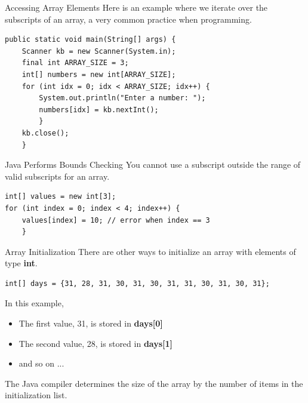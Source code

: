 \documentclass[11pt]{beamer}
\begin{document}
\begin{frame}[fragile]{Accessing Array Elements}
Here is an example where we iterate over the subscripts of an array, a very common practice when programming.
    \begin{lstlisting}
public static void main(String[] args) {
    Scanner kb = new Scanner(System.in);
    final int ARRAY_SIZE = 3;
    int[] numbers = new int[ARRAY_SIZE];
    for (int idx = 0; idx < ARRAY_SIZE; idx++) {
        System.out.println("Enter a number: ");
        numbers[idx] = kb.nextInt();
        }
    kb.close();
    }
    \end{lstlisting}
\end{frame}

\begin{frame}[fragile]{Java Performs Bounds Checking}
    You cannot use a subscript outside the range of valid subscripts for an array.
    \begin{lstlisting}
int[] values = new int[3];
for (int index = 0; index < 4; index++) {
    values[index] = 10; // error when index == 3
    }
    \end{lstlisting}
\end{frame}

\begin{frame}[fragile]{Array Initialization}
    There are other ways to initialize an array with elements of type \textbf{int}.
    \begin{lstlisting}
int[] days = {31, 28, 31, 30, 31, 30, 31, 31, 30, 31, 30, 31};
    \end{lstlisting}
    In this example,
\begin{itemize}
    \item The first value, 31, is stored in \textbf{days[0]}
    \item The second value, 28, is stored in \textbf{days[1]}
    \item and so on ... 
\end{itemize}
    The Java compiler determines the size of the array by the number of items in the initialization list.
\end{frame}
\end{document}
